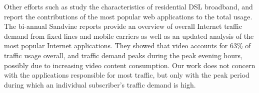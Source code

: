 Other efforts such as \cite{maier-imc2012} study the characteristics of 
residential DSL broadband, and report the contributions of the most popular 
web applications to the total usage.
The bi-annual Sandvine reports \cite{sandvine20141h, 
sandvine20142h} provide an overview of overall Internet traffic 
demand from fixed lines and mobile carriers as well as an updated analysis of 
the most popular Internet applications. They showed that video accounts for 63\%
of traffic usage overall, and traffic demand peaks during the peak evening 
hours, possibly due to increasing video content consumption. Our work does not 
concern with the applications responsible for most traffic, but only with the 
peak period during which an individual subscriber's traffic demand is high.

